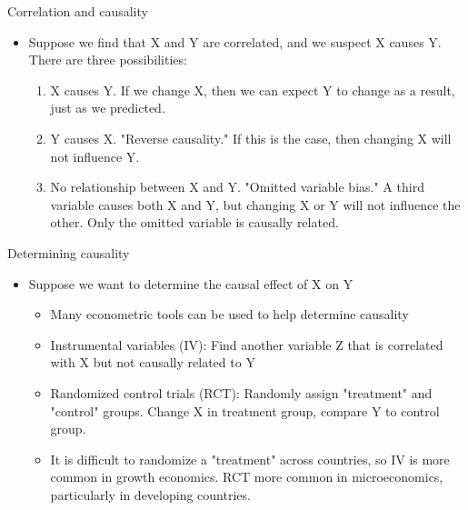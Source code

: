 \documentclass[10pt]{beamer}
\begin{document}
\begin{frame}[label={sec:org7b674b1}]{}
\alert{Correlation and causality}
\begin{itemize}
\item Suppose we find that X and Y are correlated, and we suspect X causes Y. There are three possibilities:
\begin{enumerate}
\item X causes Y. If we change X, then we can expect Y to change as a result, just as we predicted.
\item Y causes X. "Reverse causality." If this is the case, then changing X will not influence Y.
\item No relationship between X and Y. "Omitted variable bias." A third variable causes both X and Y, but changing X or Y will not influence the other. Only the omitted variable is causally related.
\end{enumerate}
\end{itemize}
\end{frame}

\begin{frame}[label={sec:org73c2abf}]{}
\alert{Determining causality}
\begin{itemize}
\item Suppose we want to determine the causal effect of X on Y
\begin{itemize}
\item Many econometric tools can be used to help determine causality
\item Instrumental variables (IV): Find another variable Z that is correlated with X but not causally related to Y
\item Randomized control trials (RCT): Randomly assign "treatment" and "control" groups. Change X in treatment group, compare Y to control group.
\item It is difficult to randomize a "treatment" across countries, so IV is more common in growth economics. RCT more common in microeconomics, particularly in developing countries.
\end{itemize}
\end{itemize}
\end{frame}
\end{document}
